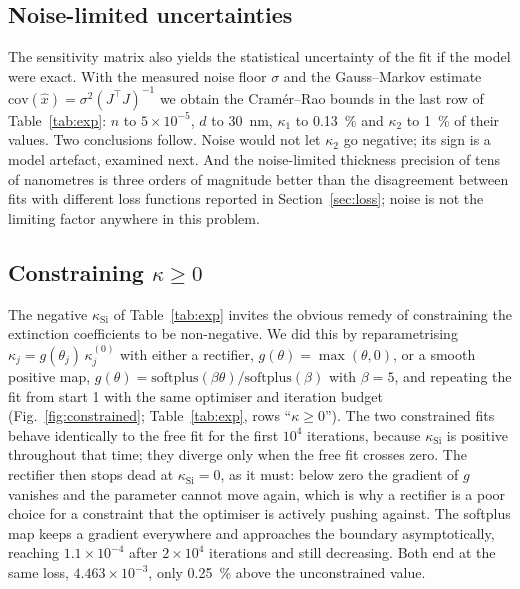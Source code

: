 \documentclass{optica-article}
\newcommand{\kap}{\kappa}
\begin{document}
\subsection{Noise-limited uncertainties}\label{sec:cr}
The sensitivity matrix also yields the statistical uncertainty of the fit if the model were exact. With the measured noise floor $\sigma$ and the Gauss--Markov estimate $\mathrm{cov}(\hat x)=\sigma^2 (J^\top J)^{-1}$ \cite{Kay1993} we obtain the Cram\'er--Rao bounds in the last row of Table~\ref{tab:exp}: $n$ to $5\times10^{-5}$, $d$ to \SI{30}{\nano\metre}, $\kap_1$ to \SI{0.13}{\percent} and $\kap_2$ to \SI{1}{\percent} of their values. Two conclusions follow. Noise would not let $\kap_2$ go negative; its sign is a model artefact, examined next. And the noise-limited thickness precision of tens of nanometres is three orders of magnitude better than the disagreement between fits with different loss functions reported in Section~\ref{sec:loss}; noise is not the limiting factor anywhere in this problem.

\subsection{Constraining $\kap\ge0$}\label{sec:constrained}
The negative $\kap_{\mathrm{Si}}$ of Table~\ref{tab:exp} invites the obvious remedy of constraining the extinction coefficients to be non-negative. We did this by reparametrising $\kap_j = g(\theta_j)\,\kap_j^{(0)}$ with either a rectifier, $g(\theta)=\max(\theta,0)$, or a smooth positive map, $g(\theta)=\mathrm{softplus}(\beta\theta)/\mathrm{softplus}(\beta)$ with $\beta=5$, and repeating the fit from start 1 with the same optimiser and iteration budget (Fig.~\ref{fig:constrained}; Table~\ref{tab:exp}, rows ``$\kap\ge0$''). The two constrained fits behave identically to the free fit for the first $10^4$ iterations, because $\kap_{\mathrm{Si}}$ is positive throughout that time; they diverge only when the free fit crosses zero. The rectifier then stops dead at $\kap_{\mathrm{Si}}=0$, as it must: below zero the gradient of $g$ vanishes and the parameter cannot move again, which is why a rectifier is a poor choice for a constraint that the optimiser is actively pushing against. The softplus map keeps a gradient everywhere and approaches the boundary asymptotically, reaching $1.1\times10^{-4}$ after $2\times10^4$ iterations and still decreasing. Both end at the same loss, $4.463\times10^{-3}$, only \SI{0.25}{\percent} above the unconstrained value.
\end{document}

